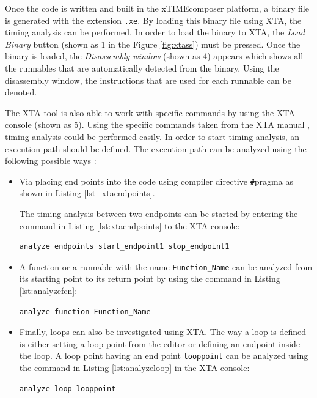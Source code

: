 Once the code is written and built in the xTIMEcomposer platform, a binary file is generated with the extension \texttt{.xe}. By loading this binary file using XTA, the timing analysis can be performed. In order to load the binary to XTA, the \textit{Load Binary} button (shown as 1 in the Figure \ref{fig:xtass}) must be pressed. Once the binary is loaded, the \textit{Disassembly window} (shown as 4) appears which shows all the runnables that are automatically detected from the binary. Using the disassembly window, the instructions that are used for each runnable can be denoted.

The XTA tool is also able to work with specific commands by using the XTA console (shown as 5). Using the specific commands taken from the XTA manual \cite{xtamanual}, timing analysis could be performed easily. In order to start timing analysis, an execution path should be defined. The execution path can be analyzed using the following possible ways \cite{xtamanual}:

\begin{itemize}
	\item Via placing end points into the code using compiler directive \texttt{\#}pragma as shown in Listing \ref{lst_xtaendpoints}.
	
	The timing analysis between two endpoints can be started by entering the command in Listing \ref{lst:xtaendpoints} to the XTA console:
	\begin{lstlisting}[caption={Placing endpoints in XTA},label={lst:xtaendpoints},style=xc]
	analyze endpoints start_endpoint1 stop_endpoint1
	\end{lstlisting}
	\item A function or a runnable with the name \texttt{Function\texttt{\_}Name} can be analyzed from its starting point to its return point by using the command in Listing \ref{lst:analyzefcn}:
	\begin{lstlisting}[caption={Analyzing a function in XTA},label={lst:analyzefcn},style=xc]
	analyze function Function_Name
	\end{lstlisting}
	\item Finally, loops can also be investigated using XTA. The way a loop is defined is either setting a loop point from the editor or defining an endpoint inside the loop. A loop point having an end point \texttt{looppoint} can be analyzed using the command in Listing \ref{lst:analyzeloop} in the XTA console: \\
	\begin{lstlisting}[caption={Analyzing a loop in XTA},label={lst:analyzeloop},style=xc]
		analyze loop looppoint
	\end{lstlisting}
\end{itemize}

